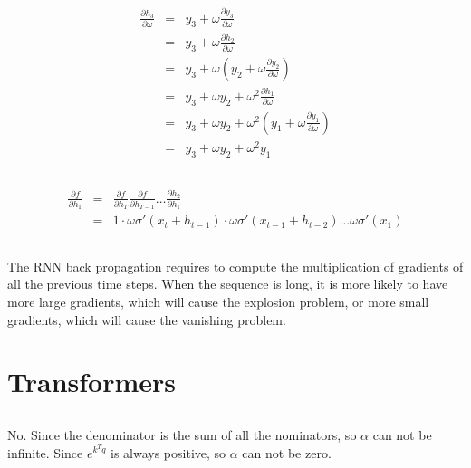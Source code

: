 \documentclass[12pt]{article}
\begin{document}
\subsection{}
\begin{eqnarray}
    \frac{\partial h_3}{\partial \omega} &=& y_3 + \omega \frac{\partial y_3}{\partial\omega} \nonumber \\
    &=& y_3 + \omega \frac{\partial h_2}{\partial \omega} \nonumber \\
    &=& y_3 + \omega (y_2 + \omega \frac{\partial y_2}{\partial \omega}) \nonumber \\
    &=& y_3 + \omega y_2 + \omega^2 \frac{\partial h_1}{\partial \omega} \nonumber \\
    &=& y_3 + \omega y_2 + \omega^2 (y_1 + \omega \frac{\partial y_1}{\partial \omega}) \nonumber \\
    &=& y_3 + \omega y_2 + \omega^2 y_1 \nonumber
\end{eqnarray}

\subsection{}
\begin{eqnarray}
    \frac{\partial f}{\partial h_1} &=& \frac{\partial f}{\partial h_T} \frac{\partial f}{\partial h_{T-1}} \dots \frac{\partial h_2}{\partial h_1} \nonumber \\
    &=& 1 \cdot \omega \sigma'(x_t + h_{t-1}) \cdot \omega \sigma'(x_{t-1} + h_{t-2}) \dots \omega \sigma'(x_1) \nonumber 
\end{eqnarray}

\subsection{}
The RNN back propagation requires to compute the multiplication of gradients of all the previous time steps. When the sequence is long, it is more likely to have more large gradients, which will cause the explosion problem, or more small gradients, which will cause the vanishing problem.

\section{Transformers}
\subsection{}
No. Since the denominator is the sum of all the nominators, so $\alpha$ can not be infinite. Since $e^{k^T q}$ is always positive, so $\alpha$ can not be zero. 
\end{document}
